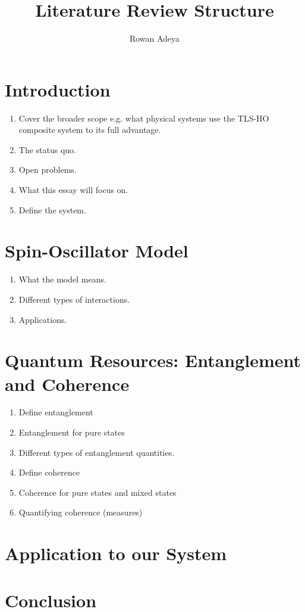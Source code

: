 \documentclass{article}
\title{Literature Review Structure}
\author{Rowan Adeya}
\date{ }
\begin{document}
\maketitle

\tableofcontents

\newpage

\section{Introduction}

\begin{enumerate}
    \item Cover the broader scope e.g. what physical systems use the TLS-HO composite system to its full advantage. 
    \item The status quo.
    \item Open problems. 
    \item What this essay will focus on.
    \item Define the system. 
\end{enumerate}


\section{Spin-Oscillator Model}

\begin{enumerate}
    \item What the model means.
    \item Different types of interactions.
    \item Applications.
\end{enumerate}


\section{Quantum Resources: Entanglement and Coherence}

\begin{enumerate}
    \item Define entanglement
    \item Entanglement for pure states
    \item Different types of entanglement quantities.
    \item Define coherence 
    \item Coherence for pure states and mixed states
    \item Quantifying coherence (measures)
\end{enumerate}

\section{Application to our System}


\section{Conclusion}
\end{document}
